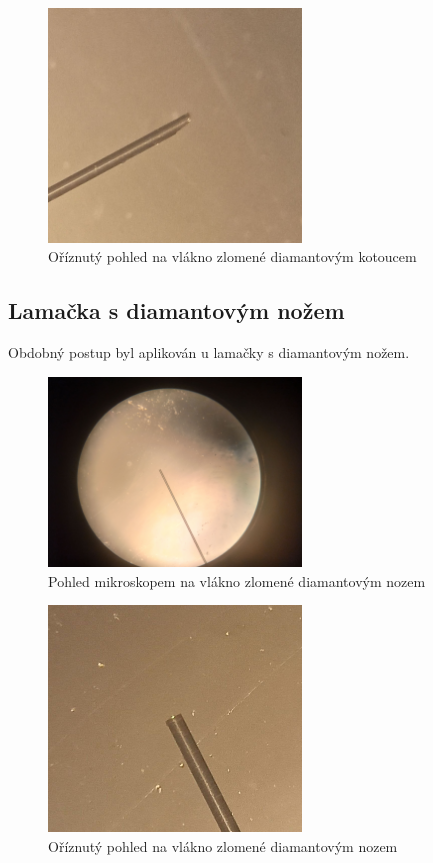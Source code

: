 \documentclass{protokol}
\begin{document}
    \begin{figure}[h!]
      \centering
      \includegraphics[width=0.6\textwidth]{text/img/diamantovyKotouc-O.jpg}
      \caption{\label{fig:diamKot_O} Oříznutý pohled na vlákno zlomené diamantovým kotoucem}
    \end{figure}

  \newpage
  \clearpage

  \subsection{Lamačka s diamantovým nožem}
    Obdobný postup byl aplikován u lamačky s diamantovým nožem.

    \begin{figure}[h!]
      \centering
      \includegraphics[width=0.6\textwidth]{text/img/diamantovyNuz.jpg} 
      \caption{\label{fig:diamNuz} Pohled mikroskopem na vlákno zlomené diamantovým nozem}
    \end{figure}

    \begin{figure}[h!]
      \centering
      \includegraphics[width=0.6\textwidth]{text/img/diamantovyNuz-O.jpg}
      \caption{\label{fig:diamNuz-O} Oříznutý pohled na vlákno zlomené diamantovým nozem}
    \end{figure}
\end{document}
